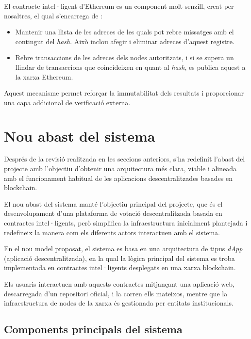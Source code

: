 \documentclass[12pt,a4paper]{article}
\begin{document}
El contracte intel·ligent d'Ethereum es un component molt senzill, creat per nosaltres, el qual s'encarrega de :
\begin{itemize}
    \item Mantenir una llista de les adreces de les quals pot rebre missatges amb el contingut del \textit{hash}. Això inclou afegir i eliminar adreces d'aquest registre.
    \item Rebre transaccions de les adreces dels nodes autoritzats, i si se supera un llindar de transaccions que coincideixen en quant al \textit{hash}, es publica aquest a la xarxa Ethereum.
\end{itemize}


Aquest mecanisme permet reforçar la immutabilitat dels resultats i proporcionar una capa addicional de verificació externa.


\section{Nou abast del sistema}

Després de la revisió realitzada en les seccions anteriors, s'ha redefinit l'abast del projecte amb l'objectiu d'obtenir una arquitectura més clara, viable i alineada amb el funcionament habitual de les aplicacions descentralitzades basades en blockchain.

El nou abast del sistema manté l'objectiu principal del projecte, que és el desenvolupament d'una plataforma de votació descentralitzada basada en contractes intel·ligents, però simplifica la infraestructura inicialment plantejada i redefineix la manera com els diferents actors interactuen amb el sistema.

En el nou model proposat, el sistema es basa en una arquitectura de tipus \textit{dApp} (aplicació descentralitzada), en la qual la lògica principal del sistema es troba implementada en contractes intel·ligents desplegats en una xarxa blockchain.

Els usuaris interactuen amb aquests contractes mitjançant una aplicació web, descarregada d'un repositori oficial, i la corren ells mateixos, mentre que la infraestructura de nodes de la xarxa és gestionada per entitats institucionals.

\subsection{Components principals del sistema}
\end{document}
